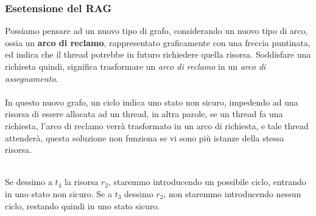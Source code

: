 \documentclass[12pt, letterpaper]{article}
\newcommand{\acc}{\\\hphantom{}\\}
\begin{document}
\subsubsection{Esetensione del RAG}
Possiamo pensare ad un nuovo tipo di grafo, considerando un nuovo tipo di arco, ossia un \textbf{arco di reclamo}, rappresentato graficamente con una freccia puntinata, ed indica che il 
thread potrebbe in futuro richiedere quella risorsa. Soddisfare una richiesta quindi, significa 
trasformare un \textit{arco di reclamo} in un \textit{arco di assegnamento}. \acc In questo nuovo 
grafo, un ciclo indica uno stato non sicuro, impedendo ad una risorsa di essere allocata ad un thread, in altra parole, 
se un thread fa una richiesta, l'arco di reclamo verrà trasformato in un arco di richiesta, e tale thread 
attenderà, questa soluzione non funziona se vi sono più istanze della stessa risorsa.\begin{figure}[h]
\end{figure}
\\ Se dessimo a \(t_4\) la risorsa \(r_2\), staremmo introducendo un possibile ciclo, entrando in uno 
stato non sicuro. Se a \(t_3\) dessimo \(r_2\), non staremmo introducendo nessun ciclo, restando quindi 
in uno stato sicuro.
\end{document}
